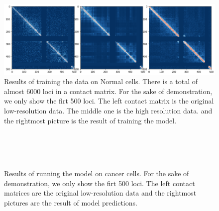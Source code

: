 \documentclass{article}
\begin{document}
\begin{figure}
        \includegraphics[width= 6in]{mit.png}
        \caption{Results of training the data on
        Normal cells. There is a total of almost
        6000 loci in a contact matrix. For the
        sake of demonstration, we only show the
        firt 500 loci. The left contact matrix is the 
        original low-resolution data. The middle one 
        is the high resolution data. and the rightmost
        picture is the result of training the model.}
        \label{fig:train}
\end{figure}
\begin{figure}
        \\
        \\
        \\
        \caption{Results of running the model on
        cancer cells. For the
        sake of demonstration, we only show the
        firt 500 loci. The left contact matrices 
        are the 
        original low-resolution data and the rightmost
        pictures are the result of model predictions.}
        \label{fig:predict}
\end{figure}
\end{document}
